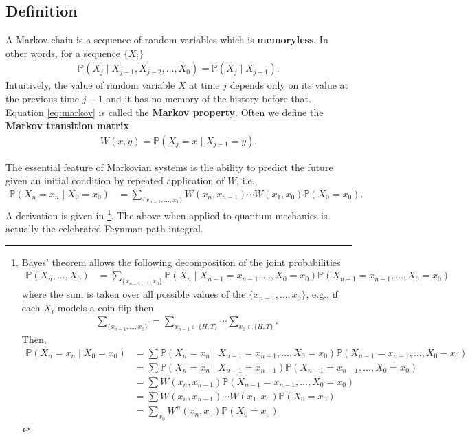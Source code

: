 \documentclass[11pt]{article}
\begin{document}
\subsection{Definition}
\label{sec:org71ab151}
A Markov chain is a sequence of random variables which is \textbf{memoryless}. In other
words, for a sequence \(\{X_{i}\}\)
\begin{align}
\label{eq:markov}
\mathbb{P}(X_{j} \mid X_{j-1}, X_{j-2}, \ldots, X_{0}) = \mathbb{P}(X_{j} \mid X_{j-1}).
\end{align}
Intuitively, the value of random variable \(X\) at time \(j\) depends only on
its value at the previous time \(j-1\) and it has no memory of the history
before that. Equation \eqref{eq:markov} is called the \textbf{Markov property}. Often
we define the \textbf{Markov transition matrix}
\begin{align*}
W(x, y) = \mathbb{P}(X_{j} = x \mid X_{j-1} = y).
\end{align*}

The essential feature of Markovian systems is the ability to predict
the future given an initial condition by repeated application of \(W\), i.e.,
\begin{align}
\label{eq:propagator}
\mathbb{P}(X_{n} = x_{n} \mid X_{0} = x_{0}) &= \sum_{\{x_{n-1}, \ldots, x_{1}\}} W(x_{n}, x_{n-1}) \cdots W(x_{1}, x_{0})\mathbb{P}(X_{0} = x_{0}).
\end{align}
A derivation is given in \footnote{Bayes' theorem allows the following decomposition of the joint probabilities
\begin{align*}
\mathbb{P}(X_{n}, \ldots, X_{0}) &= \sum_{\{x_{n-1}, \ldots, x_{0}\}}\mathbb{P}(X_{n} \mid X_{n-1}= x_{n-1}, \ldots, X_{0} = x_{0}) \mathbb{P}(X_{n-1} = x_{n-1}, \ldots, X_{0} = x_{0})
\end{align*}
where the sum is taken over all possible values of the \(\{x_{n-1}, \ldots,
x_{0}\}\), e.g., if each \(X_{i}\) models a coin flip then
\begin{align*}
\sum_{\{x_{n-1}, \ldots, x_{0}\}} = \sum_{x_{n-1} \in \{H, T\}} \cdots \sum_{x_{0} \in \{H,T\}}.
\end{align*}
Then,
\begin{align*}
\mathbb{P}(X_{n} = x_{n} \mid X_{0} = x_{0}) &= \sum \mathbb{P}(X_{n} = x_{n} \mid X_{n-1} = x_{n-1}, \ldots, X_{0} = x_{0}) \mathbb{P}(X_{n-1} = x_{n-1}, \ldots, X_{0} - x_{0}) \\
&= \sum \mathbb{P}(X_{n} = x_{n} \mid X_{n-1} = x_{n-1}) \mathbb{P}(X_{n-1} = x_{n-1}, \ldots, X_{0} = x_{0}) \\
&= \sum W(x_{n}, x_{n-1}) \mathbb{P}(X_{n-1} = x_{n-1}, \ldots, X_{0} = x_{0}) \\
&= \sum W(x_{n}, x_{n-1}) \cdots W(x_{1}, x_{0})\mathbb{P}(X_{0} = x_{0}) \\
&= \sum_{x_{0}} W^{n}(x_{n},x_{0}) \mathbb{P}(X_{0} = x_{0})
\end{align*}}. The above when applied to quantum mechanics is
actually the celebrated Feynman path integral.
\end{document}
